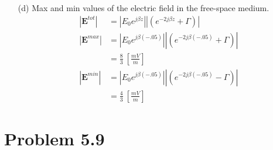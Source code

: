 \documentclass[12pt]{article}
\begin{document}
\begin{itemize}
\item[(d)] Max and min values of the electric field in the free-space medium.
\begin{align*}
  |\mathbf{E}^{tot}| &= |E_0 e^{j \beta z}||(e^{-2j \beta z} + \Gamma)|\\
  |\mathbf{E}^{max}| &=  |E_0 e^{j \beta (-.05)}||(e^{-2j \beta (-.05)} + \Gamma)|\\
                     &= \frac{8}{3}\ \left[\frac{mV}{m}\right]\\
  |\mathbf{E}^{min}| &=  |E_0 e^{j \beta (-.05)}||(e^{-2j \beta (-.05)} - \Gamma)|\\
                     &= \frac{4}{3}\ \left[\frac{mV}{m}\right]
\end{align*}  
\end{itemize}

\section*{Problem 5.9}
\end{document}
